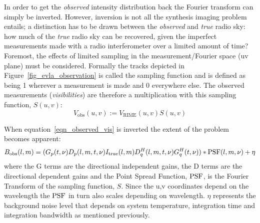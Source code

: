 In order to get the \emph{observed} intensity distribution back the Fourier transform can simply be inverted. However, inversion is not all the synthesis imaging problem entails; a distinction has to be drawn
between the \emph{observed} and \emph{true} radio sky: how much of the \emph{true} radio sky can be recovered, given the imperfect measurements made with a radio interferometer over a limited amount of time? Foremost, the
effects of limited sampling in the measurement/Fourier space (uv plane) must be considered. Formally the tracks depicted in Figure~\ref{fig_evla_observation} is called the sampling function and is defined as being 1 wherever 
a measurement is made and 0 everywhere else. The observed measurements (\emph{visibilities}) are therefore a multiplication with this sampling function, $S(u,v)$:
\begin{equation}
 V_{\text{obs}}(u,v) := V_{\text{RIME}}(u,v)S(u,v)
 \label{eqn_observed_vis}
\end{equation}

When equation~\ref{eqn_observed_vis} is inverted the extent of the problem becomes apparent:
\begin{equation}
 B_{\text{obs}}(l,m) = (G_p(t,\nu)D_p(l,m,t,\nu)I_{\text{true}}(l,m)D_q^H(l,m,t,\nu)G_q^H(t,\nu))*\textrm{PSF}{(l,m,\nu)} + \eta
\end{equation}
where the G terms are the directional independent gains, the D terms are the directional dependent gains and the Point Spread Function, $\textrm{PSF}$, is the Fourier Transform of the sampling function, $S$. Since
the u,v coordinates depend on the wavelength the $\textrm{PSF}$ in turn also scales depending on wavelength. $\eta$ represents the background noise level that depends on system temperature, integration time and integration
bandwidth as mentioned previously.

